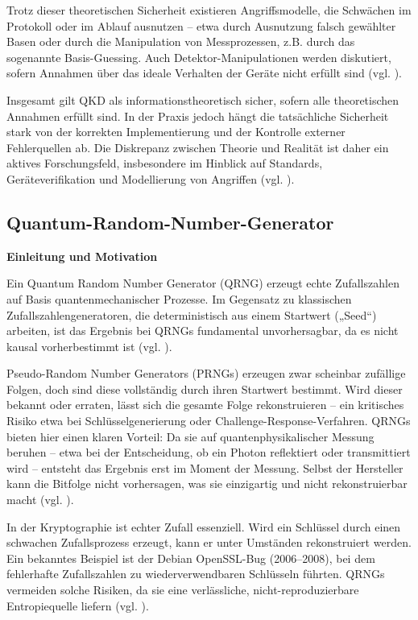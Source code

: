 Trotz dieser theoretischen Sicherheit existieren Angriffsmodelle, die Schwächen im Protokoll oder im Ablauf ausnutzen – etwa durch Ausnutzung falsch gewählter Basen oder durch die Manipulation von Messprozessen, z.B. durch das sogenannte Basis-Guessing. Auch Detektor-Manipulationen werden diskutiert, sofern Annahmen über das ideale Verhalten der Geräte nicht erfüllt sind (vgl. \cite{scarani_et_al_security_2009}).


Insgesamt gilt QKD als informationstheoretisch sicher, sofern alle theoretischen Annahmen erfüllt sind. In der Praxis jedoch hängt die tatsächliche Sicherheit stark von der korrekten Implementierung und der Kontrolle externer Fehlerquellen ab. Die Diskrepanz zwischen Theorie und Realität ist daher ein aktives Forschungsfeld, insbesondere im Hinblick auf Standards, Geräteverifikation und Modellierung von Angriffen (vgl. \cite{mosca_et_al_cybersecurity_2018}).


\subsection{Quantum-Random-Number-Generator}
\textbf{Einleitung und Motivation}


Ein Quantum Random Number Generator (QRNG) erzeugt echte Zufallszahlen auf Basis quantenmechanischer Prozesse. Im Gegensatz zu klassischen Zufallszahlengeneratoren, die deterministisch aus einem Startwert („Seed“) arbeiten, ist das Ergebnis bei QRNGs fundamental unvorhersagbar, da es nicht kausal vorherbestimmt ist (vgl. \cite{herrero-collantes_et_al_quantum_2017}).


Pseudo-Random Number Generators (PRNGs) erzeugen zwar scheinbar zufällige Folgen, doch sind diese vollständig durch ihren Startwert bestimmt. Wird dieser bekannt oder erraten, lässt sich die gesamte Folge rekonstruieren – ein kritisches Risiko etwa bei Schlüsselgenerierung oder Challenge-Response-Verfahren.
QRNGs bieten hier einen klaren Vorteil: Da sie auf quantenphysikalischer Messung beruhen – etwa bei der Entscheidung, ob ein Photon reflektiert oder transmittiert wird – entsteht das Ergebnis erst im Moment der Messung. Selbst der Hersteller kann die Bitfolge nicht vorhersagen, was sie einzigartig und nicht rekonstruierbar macht (vgl. \cite{ma_x_et_al_quantum_2016}).


In der Kryptographie ist echter Zufall essenziell. Wird ein Schlüssel durch einen schwachen Zufallsprozess erzeugt, kann er unter Umständen rekonstruiert werden. Ein bekanntes Beispiel ist der Debian OpenSSL-Bug (2006–2008), bei dem fehlerhafte Zufallszahlen zu wiederverwendbaren Schlüsseln führten. QRNGs vermeiden solche Risiken, da sie eine verlässliche, nicht-reproduzierbare Entropiequelle liefern (vgl. \cite{herrero-collantes_et_al_quantum_2017, 2017}).


